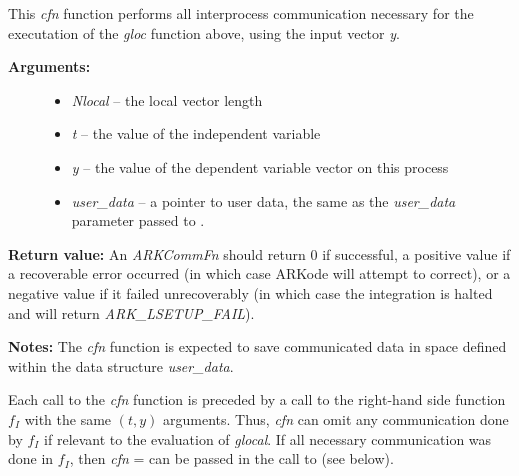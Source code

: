 \documentclass[letterpaper,10pt,english]{sphinxmanual}
\begin{document}
\begin{fulllineitems}
\label{c_interface/Preconditioners:c.ARKCommFn}
This \emph{cfn} function performs all interprocess
communication necessary for the executation of the \emph{gloc} function
above, using the input vector \emph{y}.
\begin{description}
\item[{\textbf{Arguments:}}] \leavevmode\begin{itemize}
\item {} 
\emph{Nlocal} -- the local vector length

\item {} 
\emph{t} -- the value of the independent variable

\item {} 
\emph{y} -- the value of the dependent variable vector on this process

\item {} 
\emph{user\_data} -- a pointer to user data, the same as the
\emph{user\_data} parameter passed to {\hyperref[c_interface/User_callable:c.ARKodeSetUserData]{\emph{}}}.

\end{itemize}

\end{description}

\textbf{Return value:}
An \emph{ARKCommFn} should return 0 if successful, a positive value if a
recoverable error occurred (in which case ARKode will attempt to
correct), or a negative value if it failed unrecoverably (in which
case the integration is halted and {\hyperref[c_interface/User_callable:c.ARKode]{\emph{}}} will return
\emph{ARK\_LSETUP\_FAIL}).

\textbf{Notes:}  The \emph{cfn} function is expected to save communicated data in
space defined within the data structure \emph{user\_data}.

Each call to the \emph{cfn} function is preceded by a call to the
right-hand side function \(f_I\) with the same \((t,y)\)
arguments. Thus, \emph{cfn} can omit any communication done by
\(f_I\) if relevant to the evaluation of \emph{glocal}. If all
necessary communication was done in \(f_I\), then \emph{cfn} =
 can be passed in the call to {\hyperref[c_interface/Preconditioners:c.ARKBBDPrecInit]{\emph{}}}
(see below).

\end{fulllineitems}
\end{document}
